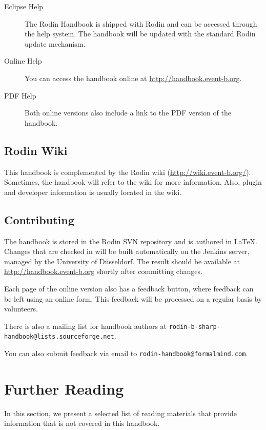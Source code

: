 \documentclass[12pt]{book}
\begin{document}
\begin{description}
	\item[Eclipse Help] The Rodin Handbook is shipped with Rodin and can be accessed through the help system.  The handbook will be updated with the standard Rodin update mechanism.
	\item[Online Help] You can access the handbook online at \url{http://handbook.event-b.org}.
	\item[PDF Help] Both online versions also include a link to the PDF version of the handbook.
\end{description}

\subsection{Rodin Wiki}
\label{rodin_wiki}

This handbook is complemented by the Rodin wiki (\url{http://wiki.event-b.org/}).  Sometimes, the handbook will refer to the wiki for more information.  Also, plugin and developer information is usually located in the wiki.

\subsection{Contributing}
\label{feedback}

The handbook is stored in the Rodin SVN repository and is authored in \LaTeX.  Changes that are checked in will be built automatically on the Jenkins server, managed by the University of Düsseldorf.  The result should be available at \url{http://handbook.event-b.org} shortly after committing changes.

Each page of the online version also has a feedback button, where feedback can be left using an online form.  This feedback will be processed on a regular basis by volunteers.

There is also a mailing list for handbook authors at \texttt{rodin-b-sharp-handbook@lists.sourceforge.net}.

You can also submit feedback via email to \texttt{rodin-hand\-book@formal\-mind.com}.

\section{Further Reading}
\label{literature}

In this section, we present a selected list of reading materials that provide information that is not covered in this handbook.
\end{document}
